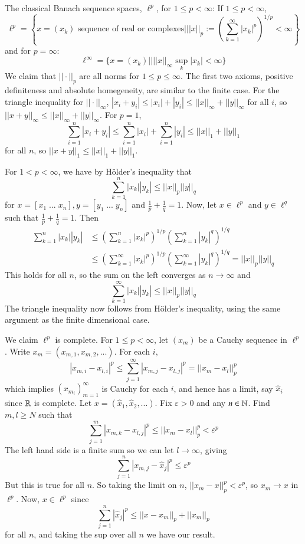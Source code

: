 \begin{example}
    The classical Banach sequence spaces, $\ell^p$, for $1 \leq p < \infty$: If $1 \leq p < \infty$, $$\ell^p = \left\{x=(x_k)\text{ sequence of real or complexes}\vert||x||_p := \left(\sum_{k=1}^{\infty}|x_k|^p\right)^{1/p} < \infty\right\}$$ and for $p = \infty$: $$\ell^{\infty} = \{x=(x_k)\vert \vert ||x||_{\infty}\sup_k|x_k| < \infty\}$$ We claim that $||\cdot||_p$ are all norms for $1 \leq p \leq \infty$. The first two axioms, positive definiteness and absolute homegeneity, are similar to the finite case. For the triangle inequality for $||\cdot||_{\infty}$, $|x_i+y_i|\leq |x_i|+|y_i|\leq ||x||_{\infty}+||y||_{\infty}$ for all $i$, so $||x+y||_{\infty} \leq ||x||_{\infty}+||y||_{\infty}$. 
    For $p = 1$, $$\sum_{i=1}^n|x_i + y_i| \leq \sum_{i=1}^n|x_i| + \sum_{i=1}^n|y_i| \leq ||x||_1+||y||_1$$ for all $n$, so $||x+y||_1 \leq ||x||_1+||y||_1$.

    For $1 < p < \infty$, we have by H\"{o}lder's inequality that $$\sum_{k=1}^n|x_k||y_k| \leq ||x||_p||y||_q$$ for $x = [x_1\;...\;x_n],y = [y_1\;...\;y_n]$ and $\frac{1}{p}+\frac{1}{q} = 1$. Now, let $x \in \ell^p$ and $y \in \ell^q$ such that $\frac{1}{p}+\frac{1}{q} = 1$. Then \begin{align*}
        \sum_{k=1}^n|x_k||y_k| &\leq \left(\sum_{k=1}^n|x_k|^p\right)^{1/p}\left(\sum_{k=1}^n|y_k|^q\right)^{1/q} \\
        &\leq \left(\sum_{k=1}^{\infty}|x_k|^p\right)^{1/p}\left(\sum_{k=1}^{\infty}|y_k|^q\right)^{1/q} = ||x||_p||y||_q
    \end{align*}
    This holds for all $n$, so the sum on the left converges as $n\rightarrow \infty$ and $$\sum_{k=1}^{\infty}|x_k||y_k| \leq ||x||_p||y||_q$$ The triangle inequality now follows from H\"{o}lder's inequality, using the same argument as the finite dimensional case.

    We claim $\ell^p$ is complete. For $1 \leq p < \infty$, let $(x_m)$ be a Cauchy sequence in $\ell^p$. Write $x_m = (x_{m,1},x_{m,2},...)$. For each $i$, $$|x_{m,i} - x_{l,i}|^p \leq \sum_{j=1}^{\infty}|x_{m,j}-x_{l,j}|^p = ||x_m - x_l||_p^p$$ which implies $(x_{m_i})_{m=1}^{\infty}$ is Cauchy for each $i$, and hence has a limit, say $\hat{x}_i$ since $\mathbb R$ is complete. Let $x = (\hat{x}_1,\hat{x}_2,...)$. Fix $\varepsilon > 0$ and any $n \in \mathbb N$. Find $m,l \geq N$ such that $$\sum_{j=1}^m|x_{m,k} - x_{l,j}|^p\leq ||x_m - x_l||_p^p < \varepsilon^p$$ The left hand side is a finite sum so we can let $l\rightarrow \infty$, giving $$\sum_{j=1}^n|x_{m,j} - \hat{x}_j|^p\leq \varepsilon^p$$ But this is true for all $n$. So taking the limit on $n$, $||x_m-x||_p^p < \varepsilon^p$, so $x_m\rightarrow x$ in $\ell^p$. Now, $x \in \ell^p$ since $$\sum_{j=1}^n|\hat{x}_j|^p \leq ||x-x_m||_p + ||x_m||_p$$ for all $n$, and taking the sup over all $n$ we have our result.
\end{example}

